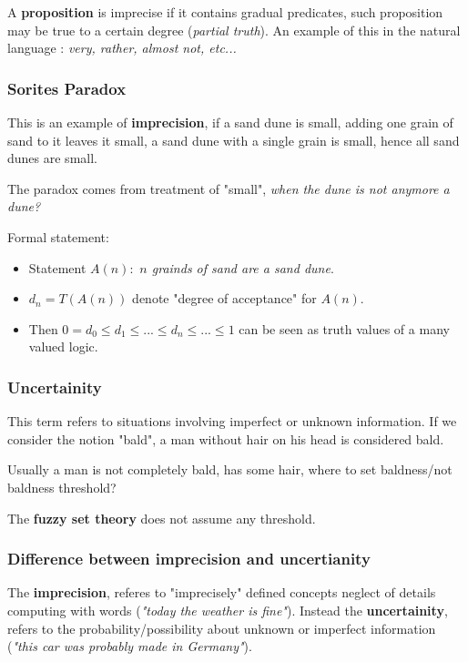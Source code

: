 \documentclass{article}
\begin{document}
A \textbf{proposition} is imprecise if it contains gradual predicates, such proposition
may be true to a certain degree (\textit{partial truth}). An example of this in the
natural language : \textit{very, rather, almost not, etc...}

\subsubsection{Sorites Paradox}
This is an example of \textbf{imprecision}, if a sand dune is small, adding one grain of
sand to it leaves it small, a sand dune with a single grain is small, hence all
sand dunes are small.

The paradox comes from treatment of "small", \textit{when the dune is not anymore a
    dune?}

Formal statement:
\begin{itemize}
    \item Statement $A(n):$ \textit{$n$ grainds of sand are a sand dune}.
    \item $d_n=T(A(n))$ denote "degree of acceptance" for $A(n)$.
    \item Then $0=d_0\leq d_1 \leq ... \leq d_n \leq ... \leq 1$ can
          be seen as truth values of a many valued logic.
\end{itemize}

\subsubsection{Uncertainity}
This term refers to situations involving imperfect or unknown information. If we
consider the notion "bald", a man without hair on his head is considered bald.

Usually a man is not completely bald, has some hair, where to set baldness/not baldness
threshold?

The \textbf{fuzzy set theory} does not assume any threshold.

\subsubsection{Difference between imprecision and uncertianity}
The \textbf{imprecision}, referes to "imprecisely"
defined concepts neglect of details computing with words (\textit{"today the
    weather is fine"}). Instead the \textbf{uncertainity}, refers to the probability/possibility
about unknown or imperfect information (\textit{"this car was probably made in Germany"}).
\end{document}
